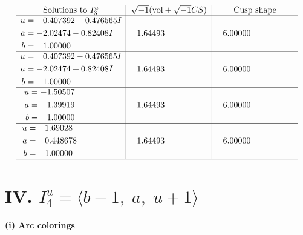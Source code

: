 \documentclass[1p]{elsarticle_modified}
\theoremstyle{definition}
\newcommand{\I}{\sqrt{-1}}
\begin{document}
$$\begin{array}{c|c|c}  
\text{Solutions to }I^u_{3}& \I (\text{vol} + \sqrt{-1}CS) & \text{Cusp shape}\\
 \hline 
\begin{aligned}
u &= \phantom{-}0.407392 + 0.476565 I \\
a &= -2.02474 - 0.82408 I \\
b &= \phantom{-}1.00000\phantom{ +0.000000I}\end{aligned}
 & \phantom{-}1.64493\phantom{ +0.000000I} & \phantom{-}6.00000\phantom{ +0.000000I} \\ \hline\begin{aligned}
u &= \phantom{-}0.407392 - 0.476565 I \\
a &= -2.02474 + 0.82408 I \\
b &= \phantom{-}1.00000\phantom{ +0.000000I}\end{aligned}
 & \phantom{-}1.64493\phantom{ +0.000000I} & \phantom{-}6.00000\phantom{ +0.000000I} \\ \hline\begin{aligned}
u &= -1.50507\phantom{ +0.000000I} \\
a &= -1.39919\phantom{ +0.000000I} \\
b &= \phantom{-}1.00000\phantom{ +0.000000I}\end{aligned}
 & \phantom{-}1.64493\phantom{ +0.000000I} & \phantom{-}6.00000\phantom{ +0.000000I} \\ \hline\begin{aligned}
u &= \phantom{-}1.69028\phantom{ +0.000000I} \\
a &= \phantom{-}0.448678\phantom{ +0.000000I} \\
b &= \phantom{-}1.00000\phantom{ +0.000000I}\end{aligned}
 & \phantom{-}1.64493\phantom{ +0.000000I} & \phantom{-}6.00000\phantom{ +0.000000I}\\
 \hline 
 \end{array}$$\newpage\newpage\renewcommand{\arraystretch}{1}
\centering \section*{IV. $I^u_{4}= \langle b-1,\;a,\;u+1 \rangle$}
\flushleft \textbf{(i) Arc colorings}\\
\end{document}
